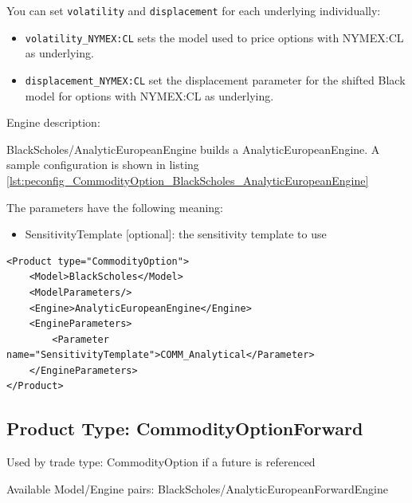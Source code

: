 You can set \texttt{volatility} and \texttt{displacement} for each underlying individually:
\begin{itemize}
    \item \texttt{volatility\_NYMEX:CL} sets the model used to price options with NYMEX:CL as underlying.
    \item \texttt{displacement\_NYMEX:CL} set the displacement parameter for the shifted Black model for options with NYMEX:CL as underlying.
\end{itemize}

Engine description:

BlackScholes/AnalyticEuropeanEngine builds a AnalyticEuropeanEngine. A sample configuration is shown in listing
\ref{lst:peconfig_CommodityOption_BlackScholes_AnalyticEuropeanEngine}

The parameters have the following meaning:

\begin{itemize}
\item SensitivityTemplate [optional]: the sensitivity template to use
\end{itemize}

\begin{longlisting}
\begin{verbatim}
<Product type="CommodityOption">
    <Model>BlackScholes</Model>
    <ModelParameters/>
    <Engine>AnalyticEuropeanEngine</Engine>
    <EngineParameters>
        <Parameter name="SensitivityTemplate">COMM_Analytical</Parameter>
    </EngineParameters>
</Product>
\end{verbatim}
\caption{Configuration for Product CommodityOption, Model BlackScholes, Engine AnalyticEuropeanEngine}
\label{lst:peconfig_CommodityOption_BlackScholes_AnalyticEuropeanEngine}
\end{longlisting}

\subsection{Product Type: CommodityOptionForward}

Used by trade type: CommodityOption if a future is referenced

Available Model/Engine pairs: BlackScholes/AnalyticEuropeanForwardEngine

